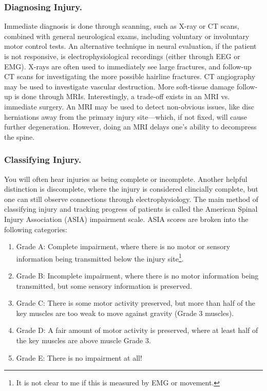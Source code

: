 \documentclass[12pt]{report}
\begin{document}
\subsubsection{Diagnosing Injury.}
Immediate diagnosis is done through scanning, such as X-ray or CT scans, combined with general neurological exams, including voluntary or involuntary motor control tests. An alternative technique in neural evaluation, if the patient is not responsive, is electrophysiological recordings (either through EEG or EMG). X-rays are often used to immediately see large fractures, and follow-up CT scans for investigating the more possible hairline fractures. CT angiography may be used to investigate vascular destruction. More soft-tissue damage follow-up is done through MRIs. Interestingly, a trade-off exists in an MRI vs. immediate surgery. An MRI may be used to detect non-obvious issues, like disc herniations away from the primary injury site---which, if not fixed, will cause further degeneration. However, doing an MRI delays one's ability to decompress the spine.\newline


\subsubsection{Classifying Injury.}
You will often hear injuries as being complete or incomplete. Another helpful distinction is discomplete, where the injury is considered clincially complete, but one can still observe connections through electrophysiology. The main method of classifying injury and tracking progress of patients is called the American Spinal Injury Association (ASIA) impairment scale. ASIA scores are broken into the following categories: 

\begin{enumerate}
    \item Grade A: Complete impairment, where there is no motor or sensory information being transmitted below the injury site\footnote{It is not clear to me if this is measured by EMG or movement.}.
    \item Grade B: Incomplete impairment, where there is no motor information being transmitted, but some sensory information is preserved. 
    \item Grade C: There is some motor activity preserved, but more than half of the key muscles are too weak to move against gravity (Grade 3 muscles). 
    \item Grade D: A fair amount of motor activity is preserved, where at least half of the key muscles are above muscle Grade 3.
    \item Grade E: There is no impairment at all!
\end{enumerate}
\end{document}
